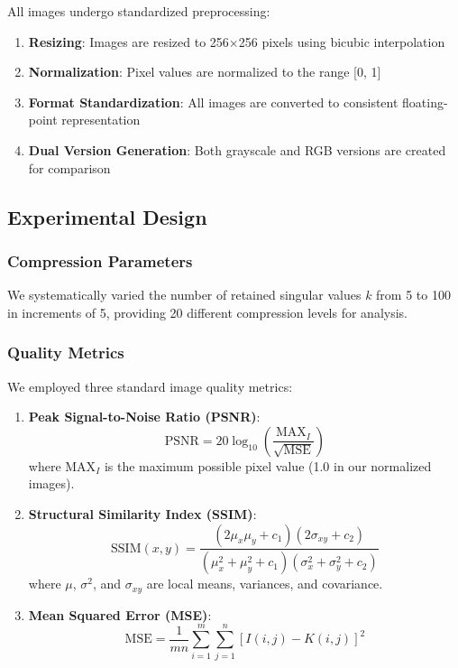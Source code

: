 \documentclass[12pt,a4paper]{article}
\begin{document}
All images undergo standardized preprocessing:

\begin{enumerate}
    \item \textbf{Resizing}: Images are resized to 256×256 pixels using bicubic interpolation
    \item \textbf{Normalization}: Pixel values are normalized to the range [0, 1]
    \item \textbf{Format Standardization}: All images are converted to consistent floating-point representation
    \item \textbf{Dual Version Generation}: Both grayscale and RGB versions are created for comparison
\end{enumerate}

\subsection{Experimental Design}

\subsubsection{Compression Parameters}

We systematically varied the number of retained singular values $k$ from 5 to 100 in increments of 5, providing 20 different compression levels for analysis.

\subsubsection{Quality Metrics}

We employed three standard image quality metrics:

\begin{enumerate}
    \item \textbf{Peak Signal-to-Noise Ratio (PSNR)}:
    \begin{equation}
    \text{PSNR} = 20 \log_{10}\left(\frac{\text{MAX}_I}{\sqrt{\text{MSE}}}\right)
    \end{equation}
    where $\text{MAX}_I$ is the maximum possible pixel value (1.0 in our normalized images).
    
    \item \textbf{Structural Similarity Index (SSIM)}:
    \begin{equation}
    \text{SSIM}(x,y) = \frac{(2\mu_x\mu_y + c_1)(2\sigma_{xy} + c_2)}{(\mu_x^2 + \mu_y^2 + c_1)(\sigma_x^2 + \sigma_y^2 + c_2)}
    \end{equation}
    where $\mu$, $\sigma^2$, and $\sigma_{xy}$ are local means, variances, and covariance.
    
    \item \textbf{Mean Squared Error (MSE)}:
    \begin{equation}
    \text{MSE} = \frac{1}{mn}\sum_{i=1}^{m}\sum_{j=1}^{n}[I(i,j) - K(i,j)]^2
    \end{equation}
\end{enumerate}
\end{document}
